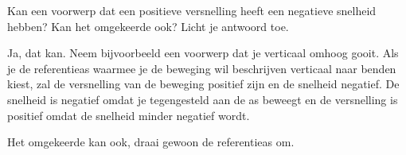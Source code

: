 

Kan een voorwerp dat een positieve versnelling heeft een negatieve snelheid hebben? Kan het omgekeerde ook? Licht je antwoord toe.

\begin{oplossing}
    Ja, dat kan. Neem bijvoorbeeld een voorwerp dat je verticaal omhoog gooit. Als je de referentieas waarmee je de beweging wil beschrijven verticaal naar benden kiest, zal de versnelling van de beweging positief zijn en de snelheid negatief. De snelheid is negatief omdat je tegengesteld aan de as beweegt en de versnelling is positief omdat de snelheid minder negatief wordt.

    Het omgekeerde kan ook, draai gewoon de referentieas om.
\end{oplossing}
